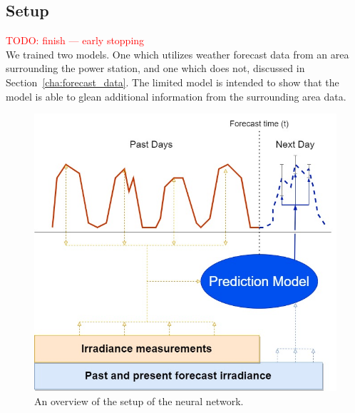 
    \subsection{Setup}
    \textcolor{red}{TODO: finish --- early stopping}\\
    We trained two models. One which utilizes weather forecast data from an area surrounding the power station, and one which does not, discussed in Section~\ref{cha:forecast_data}. The limited model is intended to show that the model is able to glean additional information from the surrounding area data.
    
    
    
    \begin{figure}[ht!]
        \centering
        \includegraphics[scale=0.6]{imgs/solar_TFT_overview.jpg}
        \caption{An overview of  the setup of the neural network.
        \label{fig:solar_tft_overviwew}}
    \end{figure}


